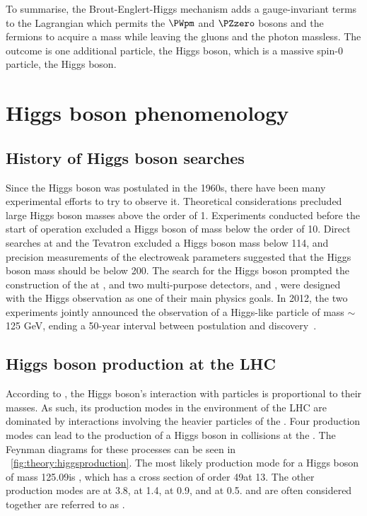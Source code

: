 To summarise, the Brout-Englert-Higgs mechanism adds a gauge-invariant terms to the \SM Lagrangian which permits the $\PWpm$ and $\PZzero$ bosons and the fermions to acquire a mass while leaving the gluons and the photon massless. The outcome is one additional particle, the Higgs boson, which is a massive spin-0 particle, the Higgs boson. 

 
\section{Higgs boson phenomenology}
\subsection{History of Higgs boson searches}

Since the Higgs boson was postulated in the 1960s, there have been many experimental efforts to try to observe it. Theoretical considerations precluded large Higgs boson masses above the order of 1\TeV. Experiments conducted before the start of \LEP operation excluded a Higgs boson of mass below the order of 10\GeV. Direct searches at \LEP and the Tevatron excluded a Higgs boson mass below 114\GeV, and precision measurements of the electroweak parameters suggested that the Higgs boson mass should be below 200\GeV. The search for the Higgs boson prompted the construction of the \LHC at \CERN, and two multi-purpose detectors, \ATLAS and \CMS, were designed with the Higgs observation as one of their main physics goals. In 2012, the two experiments jointly announced the observation of a Higgs-like particle of mass $\sim$125 GeV, ending a 50-year interval between postulation and discovery~\cite{CMSHDisc,ATLASHDisc}.

\subsection{Higgs boson production at the LHC}


According to \SM, the Higgs boson's interaction with particles is proportional to their masses. As such, its production modes in the environment of the LHC are dominated by interactions involving the heavier particles of the \SM. Four production modes can lead to the production of a Higgs boson in \pp collisions at the \LHC. The Feynman diagrams for these processes can be seen in \Fig~\ref{fig:theory:higgsproduction}. The most likely production mode for a Higgs boson of mass 125.09\GeV is \ggH, which has a cross section of order 49\pb at 13\TeV. The other production modes are \VBF at 3.8\pb, \WH at 1.4\pb, \ZH at 0.9\pb , and \ttH at 0.5\pb. \WH and \ZH are often considered together are referred to as \VH.


